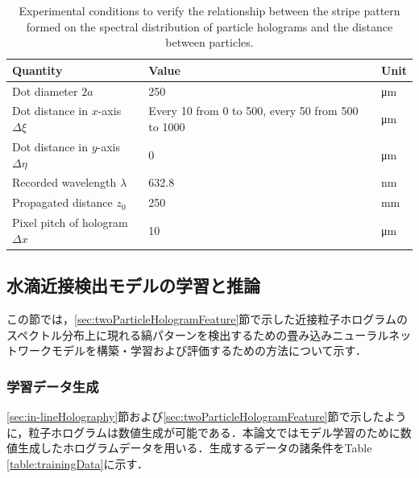 \begin{table}[H]
    \centering
    \caption{Experimental conditions to verify the relationship between the stripe pattern formed on the spectral distribution of particle holograms and the distance between particles.}
    \label{table:stripePatternExperiment}
    \begin{tabular}{lll}
    Quantity                               & Value                                             & Unit     \\ \hline \hline
    Dot diameter $2a$                      & 250                                               & \si{\um} \\ \hline
    Dot distance in $x$-axis $\Delta \xi$  & Every 10 from 0 to 500, every 50 from 500 to 1000 & \si{\um} \\ \hline
    Dot distance in $y$-axis $\Delta \eta$ & 0                                                 & \si{\um} \\ \hline 
    Recorded wavelength $\lambda$          & 632.8                                             & \si{\nm} \\ \hline
    Propagated distance $z_0$              & 250                                               & \si{\mm} \\ \hline
    Pixel pitch of hologram $\Delta x$     & 10                                                & \si{\um}
    \end{tabular}
\end{table}


\subsection{水滴近接検出モデルの学習と推論}\label{sec:EffNetV2}
この節では，\ref{sec:twoParticleHologramFeature}節で示した近接粒子ホログラムのスペクトル分布上に現れる縞パターンを検出するための畳み込みニューラルネットワークモデルを構築・学習および評価するための方法について示す．

\subsubsection{学習データ生成}
\ref{sec:in-lineHolography}節および\ref{sec:twoParticleHologramFeature}節で示したように，粒子ホログラムは数値生成が可能である．本論文ではモデル学習のために数値生成したホログラムデータを用いる．生成するデータの諸条件をTable \ref{table:trainingData}に示す．

